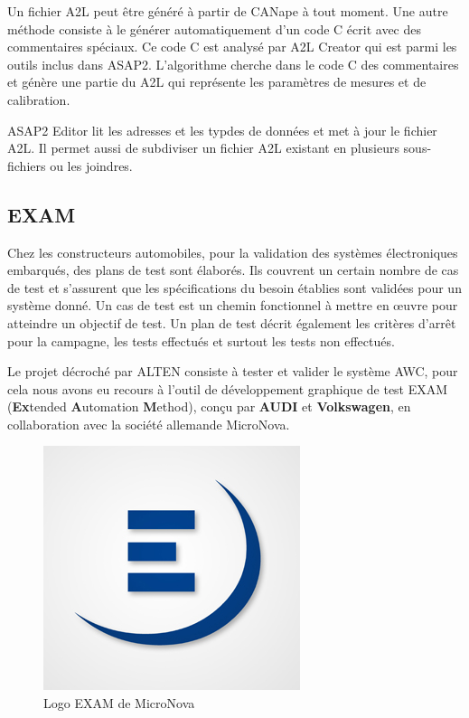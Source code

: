 Un fichier A2L peut être généré à partir de CANape à tout moment. Une autre méthode consiste à le générer automatiquement d'un code C écrit avec des commentaires spéciaux. Ce code C est analysé par A2L Creator qui est parmi les outils inclus dans ASAP2. L'algorithme cherche dans le code C des commentaires et génère une partie du A2L qui représente les paramètres de mesures et de calibration.

ASAP2 Editor lit les adresses et les typdes de données et met à jour le fichier A2L. Il permet aussi de subdiviser un fichier A2L existant en plusieurs sous-fichiers ou les joindres.




\subsection{EXAM}

Chez les constructeurs automobiles, pour la validation des systèmes électroniques embarqués, des plans de test sont élaborés. Ils couvrent un certain nombre de cas de test et s'assurent que les spécifications du besoin établies sont validées pour un système donné. Un cas de test est un chemin fonctionnel à mettre en œuvre pour atteindre un objectif de test. Un plan de test décrit également les critères d'arrêt pour la campagne, les tests effectués et surtout les tests non effectués.

Le projet décroché par ALTEN consiste à tester et valider le système AWC, pour cela nous avons eu recours à l'outil de développement graphique de test EXAM (\textbf{Ex}tended \textbf{A}utomation \textbf{M}ethod), conçu par \textbf{AUDI} et \textbf{Volkswagen}, en collaboration avec la société allemande MicroNova.

\begin{figure}[H]
 \centering
 \includegraphics[scale=1]{images/exam_logo}
 \caption{Logo EXAM de MicroNova}
\end{figure}

